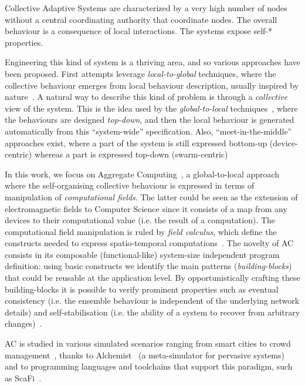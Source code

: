 \documentclass[conference]{IEEEtran}
\begin{document}
Collective Adaptive Systems are characterized by a very high number of nodes without a central coordinating authority that coordinate nodes. The overall behaviour is a consequence of local interactions. The systems expose self-* properties.
 
Engineering this kind of system is a thriving area, and so various approaches have been proposed.
 First attempts leverage \textit{local-to-global} techniques, where the collective behaviour emerges from local behaviour description, 
 usually inspired by nature~\cite{DBLP:journals/swarm/BrambillaFBD13}. 
%
 A natural way to describe this kind of problem is through a \textit{collective} view of the system.
 This is the idea used by the \textit{global-to-local} techniques~\cite{DBLP:journals/jlap/ViroliBDACP19,DBLP:journals/scp/AlrahmanNL20, DBLP:conf/cbse/BuresGHKKP13}, 
 where the behaviours are designed \textit{top-down}, and then the local behaviour is generated automatically from this ``system-wide'' specification. 
% 
Also, ``meet-in-the-middle''~\cite{DBLP:journals/computer/PinciroliB16} approaches exist, where
 a part of the system is still expressed bottom-up (device-centric) whereas a part is expressed top-down (swarm-centric)

In this work, we focus on Aggregate Computing~\cite{DBLP:journals/computer/BealPV15}, a global-to-local approach where
 the self-organising collective behaviour is expressed in terms of manipulation of \textit{computational fields}.
The latter could be seen as the extension of electromagnetic fields to Computer Science since it consists of a 
 map from any devices to their computational value (i.e. the result of a computation).
The computational field manipulation is ruled by \textit{field calculus}, which define the constructs needed 
 to express spatio-temporal computations~\cite{DBLP:journals/jlap/ViroliBDACP19}.
The novelty of AC consists in its composable (functional-like) system-size independent program definition: 
using basic constructs we identify the main patterns (\textit{building-blocks}) that could be reusable at the application level.
By opportunistically crafting these building-blocks it is possible to verify prominent properties such as eventual consistency %
 (i.e. the ensemble behaviour is independent of the underlying network details)
 and self-stabilisation %
 (i.e. the ability of a system to recover from arbitrary changes)~\cite{DBLP:journals/jlap/ViroliBDACP19}.

AC is studied in various simulated scenarios ranging from smart cities to crowd management~\cite{DBLP:journals/jlap/ViroliBDACP19}, 
 thanks to Alchemist~\cite{DBLP:journals/jos/PianiniMV13} (a meta-simulator for pervasive systems) and to programming languages and toolchains that support 
 this paradigm, such as ScaFi~\cite{DBLP:conf/isola/CasadeiVAD20}. %
\end{document}
